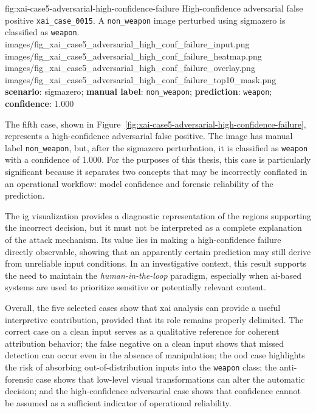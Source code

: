 \XAIcaseFigureMaskGrid
{fig:xai-case5-adversarial-high-confidence-failure}
{High-confidence adversarial false positive \texttt{xai\_case\_0015}. A
\texttt{non\_weapon} image perturbed using \gls{sigmazero} is classified as
\texttt{weapon}.}
{images/fig_xai_case5_adversarial_high_conf_failure_input.png}
{images/fig_xai_case5_adversarial_high_conf_failure_heatmap.png}
{images/fig_xai_case5_adversarial_high_conf_failure_overlay.png}
{images/fig_xai_case5_adversarial_high_conf_failure_top10_mask.png}
{\textbf{scenario}: \gls{sigmazero};
\textbf{manual label}: \texttt{non\_weapon};
\textbf{prediction}: \texttt{weapon};
\textbf{confidence}: 1.000}

The fifth case, shown in
Figure~\ref{fig:xai-case5-adversarial-high-confidence-failure}, represents a
high-confidence adversarial false positive. The image has manual label
\texttt{non\_weapon}, but, after the \gls{sigmazero} perturbation, it is
classified as \texttt{weapon} with a confidence of 1.000. For the purposes of
this thesis, this case is particularly significant because it separates two
concepts that may be incorrectly conflated in an operational workflow: model
confidence and forensic reliability of the prediction.

The \gls{ig} visualization provides a diagnostic representation of the regions
supporting the incorrect decision, but it must not be interpreted as a complete
explanation of the attack mechanism. Its value lies in making a high-confidence
failure directly observable, showing that an apparently certain prediction may
still derive from unreliable input conditions. In an investigative context, this
result supports the need to maintain the \textit{human-in-the-loop} paradigm,
especially when \gls{ai}-based systems are used to prioritize sensitive or
potentially relevant content.

Overall, the five selected cases show that \gls{xai} analysis can provide a
useful interpretive contribution, provided that its role remains properly
delimited. The correct case on a clean input serves as a qualitative reference
for coherent attribution behavior; the false negative on a clean input shows
that missed detection can occur even in the absence of manipulation; the
\gls{ood} case highlights the risk of absorbing out-of-distribution inputs into
the \texttt{weapon} class; the anti-forensic case shows that low-level visual
transformations can alter the automatic decision; and the high-confidence
adversarial case shows that confidence cannot be assumed as a sufficient
indicator of operational reliability.


